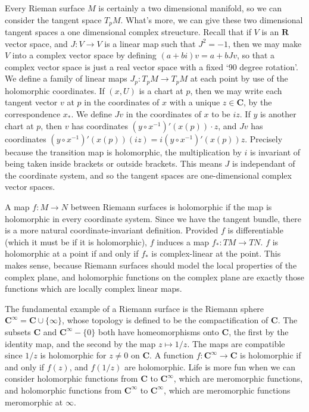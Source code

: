Every Rieman surface $M$ is certainly a two dimensional manifold, so we can consider the tangent space $T_p M$. What's more, we can give these two dimensional tangent spaces a one dimensional complex streucture. Recall that if $V$ is an $\mathbf{R}$ vector space, and $J: V \to V$ is a linear map such that $J^2 = -1$, then we may make $V$ into a complex vector space by defining $(a + bi)v = a + bJv$, so that a complex vector space is just a real vector space with a fixed `90 degree rotation'. We define a family of linear maps $J_p: T_p M \to T_p M$ at each point by use of the holomorphic coordinates. If $(x,U)$ is a chart at $p$, then we may write each tangent vector $v$ at $p$ in the coordinates of $x$ with a unique $z \in \mathbf{C}$, by the correspondence $x_*$. We define $Jv$ in the coordinates of $x$ to be $iz$. If $y$ is another chart at $p$, then $v$ has coordinates $(y \circ x^{-1})'(x(p)) \cdot z$, and $Jv$ has coordinates $(y \circ x^{-1})'(x(p))(iz) = i(y \circ x^{-1})'(x(p)) z$. Precisely because the transition map is holomorphic, the multiplication by $i$ is invariant of being taken inside brackets or outside brackets. This means $J$ is independant of the coordinate system, and so the tangent spaces are one-dimensional complex vector spaces.

A map $f: M \to N$ between Riemann surfaces is holomorphic if the map is holomorphic in every coordinate system. Since we have the tangent bundle, there is a more natural coordinate-invariant definition. Provided $f$ is differentiable (which it must be if it is holomorphic), $f$ induces a map $f_*: TM \to TN$. $f$ is holomorphic at a point if and only if $f_*$ is complex-linear at the point. This makes sense, because Riemann surfaces should model the local properties of the complex plane, and holomorphic functions on the complex plane are exactly those functions which are locally complex linear maps.

\begin{example}
    The fundamental example of a Riemann surface is the Riemann sphere $\mathbf{C}^\infty = \mathbf{C} \cup \{ \infty \}$, whose topology is defined to be the compactification of $\mathbf{C}$. The subsets $\mathbf{C}$ and $\mathbf{C}^\infty - \{ 0 \}$ both have homeomorphisms onto $\mathbf{C}$, the first by the identity map, and the second by the map $z \mapsto 1/z$. The maps are compatible since $1/z$ is holomorphic for $z \neq 0$ on $\mathbf{C}$. A function $f: \mathbf{C}^\infty \to \mathbf{C}$ is holomorphic if and only if $f(z)$, and $f(1/z)$ are holomorphic. Life is more fun when we can consider holomorphic functions from $\mathbf{C}$ to $\mathbf{C}^\infty$, which are meromorphic functions, and holomorphic functions from $\mathbf{C}^\infty$ to $\mathbf{C}^\infty$, which are meromorphic functions meromorphic at $\infty$.
\end{example}

